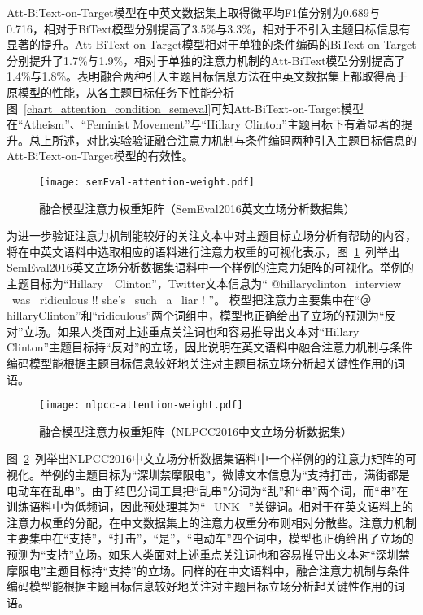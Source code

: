 Att-BiText-on-Target模型在中英文数据集上取得微平均F1值分别为0.689与0.716，相对于BiText模型分别提高了3.5\%与3.3\%，相对于不引入主题目标信息有显著的提升。Att-BiText-on-Target模型相对于单独的条件编码的BiText-on-Target分别提升了1.7\%与1.9\%，相对于单独的注意力机制的Att-BiText模型分别提高了1.4\%与1.8\%。表明融合两种引入主题目标信息方法在中英文数据集上都取得高于原模型的性能，从各主题目标任务下性能分析图~\ref{chart_attention_condition_semeval}可知Att-BiText-on-Target模型在“Atheism”、“Feminist Movement”与“Hillary Clinton”主题目标下有着显著的提升。总上所述，对比实验验证融合注意力机制与条件编码两种引入主题目标信息的Att-BiText-on-Target模型的有效性。

\begin{figure}[htbp]
	\centering
	\texttt{[image: semEval-attention-weight.pdf]}
	\caption[rnn_vanish]{融合模型注意力权重矩阵（SemEval2016英文立场分析数据集）}
	\label{semEval-attention-weight}
\end{figure}
为进一步验证注意力机制能较好的关注文本中对主题目标立场分析有帮助的内容，将在中英文语料中选取相应的语料进行注意力权重的可视化表示，图~\ref{semEval-attention-weight}~列举出SemEval2016英文立场分析数据集语料中一个样例的注意力矩阵的可视化。举例的主题目标为“Hillary　Clinton”，Twitter文本信息为“ @hillaryclinton ~interview ~was ~ridiculous !! she's ~such~ a ~liar ! ”。
模型把注意力主要集中在“＠hillaryClinton”和“ridiculous”两个词组中，模型也正确给出了立场的预测为“反对”立场。如果人类面对上述重点关注词也和容易推导出文本对“Hillary Clinton”主题目标持“反对”的立场，因此说明在英文语料中融合注意力机制与条件编码模型能根据主题目标信息较好地关注对主题目标立场分析起关键性作用的词语。

\begin{figure}[htbp]
	\centering
	\texttt{[image: nlpcc-attention-weight.pdf]}
	\caption[rnn_vanish]{融合模型注意力权重矩阵（NLPCC2016中文立场分析数据集）}
	\label{nlpcc-attention-weight}
\end{figure}

图~\ref{nlpcc-attention-weight}~列举出NLPCC2016中文立场分析数据集语料中一个样例的的注意力矩阵的可视化。举例的主题目标为“深圳禁摩限电”，微博文本信息为“支持打击，满街都是电动车在乱串”。由于结巴分词工具把“乱串”分词为“乱”和“串”两个词，而“串”在训练语料中为低频词，因此预处理其为“\_UNK\_”关键词。相对于在英文语料上的注意力权重的分配，在中文数据集上的注意力权重分布则相对分散些。注意力机制主要集中在“支持”，“打击”，“是”，“电动车”四个词中，模型也正确给出了立场的预测为“支持”立场。如果人类面对上述重点关注词也和容易推导出文本对“深圳禁摩限电”主题目标持“支持”的立场。同样的在中文语料中，融合注意力机制与条件编码模型能根据主题目标信息较好地关注对主题目标立场分析起关键性作用的词语。

